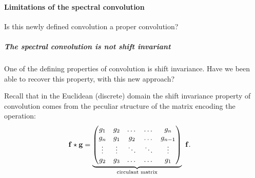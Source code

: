 \paragraph{Limitations of the spectral convolution}

Is this newly defined convolution a proper convolution?

\subparagraph{The spectral convolution is not shift invariant}

One of the defining properties of convolution is shift invariance. Have we been able to recover this property, with this new approach? 

Recall that in the Euclidean (discrete) domain the shift invariance property of convolution comes from the peculiar structure of the matrix encoding the operation:
\begin{equation}
    \begin{aligned}
        \vb{f} \star \vb{g} & = \underbrace{\mqty(
            g_1 & g_2 & \dots & \dots & g_n \\
            g_n & g_1 & g_2 & \dots & g_{n-1} \\
            \vdots & \vdots & \ddots & \ddots & \vdots \\
            g_2 & g_3 & \dots & \dots & g_1
        )}_{\mathclap{\text{circulant matrix}}} ~ \vb{f}.
        \label{eq:12:4:2:circulant}
    \end{aligned}
\end{equation}

